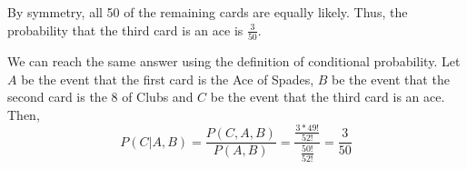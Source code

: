 By symmetry, all 50 of the remaining cards are equally likely. Thus, the probability that the third card is an ace is $\frac{3}{50}$.

We can reach the same answer using the definition of conditional probability. Let $A$ be the event that the first card is the Ace of Spades, $B$ be the event that the second card is the $8$ of Clubs and $C$ be the event that the third card is an ace. Then, $$P(C|A,B) = \frac{P(C,A,B)}{P(A,B)} = \frac{\frac{3*49!}{52!}}{\frac{50!}{52!}} = \frac{3}{50}$$